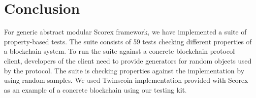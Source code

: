 
\section{Conclusion}
\label{sec:conclusion}

For generic abstract modular Scorex framework, we have implemented a suite of property-based tests. The suite consists of 59 tests checking different properties of a blockchain system. To run the suite against a concrete blockchain protocol client, developers of the client need to provide generators for random objects used by the protocol. The suite is checking properties against the implementation by using random samples. We used Twinscoin implementation provided with Scorex as an example of a concrete blockchain using our testing kit.   
